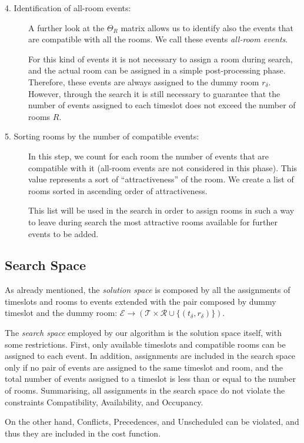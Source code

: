 \documentclass[authoryear,preprint,a4paper,12pt]{elsarticle}
\begin{document}
\begin{description}
\item[4. Identification of all-room events:] A further look at the $\Theta_R$ matrix allows us to
  identify also the events that are compatible with all the rooms. We call these events \emph{all-room events}.

  For this kind of events it is not necessary to assign a room during
  search, and the actual room can be assigned in a simple post-processing
  phase. Therefore, these events are always assigned to the dummy
  room $r_{\delta}$. However, through the search it is still necessary to guarantee that
  the number of events assigned to each timeslot does not exceed the
  number of rooms $R$. 

\item[5. Sorting rooms by the number of compatible events:] In this step, we
  count for each room the number of events that are compatible with it
  (all-room events are not considered in this phase).  This value
  represents a sort of ``attractiveness'' of the room.  We create a list of
  rooms sorted in ascending order of attractiveness.

  This list will be used in the search in order to assign rooms in
  such a way to leave during search the most attractive rooms
  available for further events to be added.
\end{description}

\subsection{Search Space}

As already mentioned, the \emph{solution space} is composed by all the
assignments of timeslots and rooms to events extended with the pair composed by dummy
timeslot and the dummy room: $\mathcal{E} \rightarrow \left( \mathcal{T} \times \mathcal{R} \cup
\{(t_\delta,r_\delta)\}\right)$.

The \emph{search space} employed by our algorithm is the solution space itself, with some
restrictions.  First, only available timeslots and compatible rooms
can be assigned to each event. In addition, assignments are included
in the search space only if no pair of events are assigned to the same
timeslot and room, and the total number of events assigned to a
timeslot is less than or equal to the number of rooms.  Summarising, all
assignments in the search space do not violate the constraints
\textsf{Compatibility}, \textsf{Availability}, and \textsf{Occupancy}.

On the other hand, \textsf{Conflicts}, \textsf{Precedences}, and
\textsf{Unscheduled} can be violated, and thus they are included in
the cost function.
\end{document}
